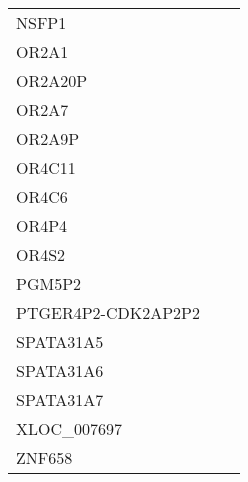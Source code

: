 \begin{tabular}{lcc}
NSFP1              &           &         \\
OR2A1              &           &         \\
OR2A20P            &           &         \\
OR2A7              &           &         \\
OR2A9P             &           &         \\
OR4C11             &           &         \\
OR4C6              &           &         \\
OR4P4              &           &         \\
OR4S2              &           &         \\
PGM5P2             &           &         \\
PTGER4P2-CDK2AP2P2 &           &         \\
SPATA31A5          &           &         \\
SPATA31A6          &           &         \\
SPATA31A7          &           &         \\
XLOC\_007697        &           &         \\
ZNF658             &           &         \\
\bottomrule
\end{tabular}
